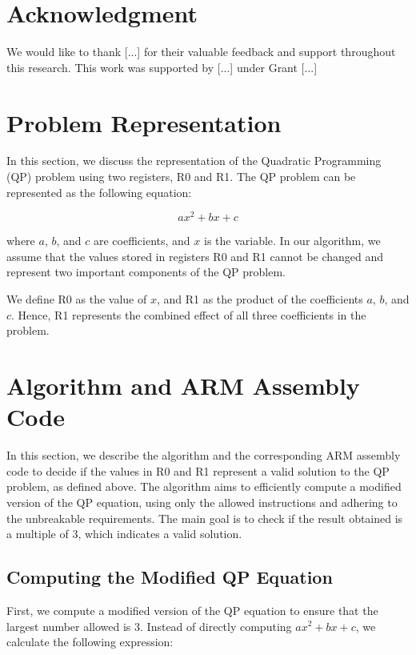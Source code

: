 \section*{Acknowledgment}

We would like to thank [...] for their valuable feedback and support throughout this research. This work was supported by [...] under Grant [...]

\section{Problem Representation}

In this section, we discuss the representation of the Quadratic Programming (QP) problem using two registers, R0 and R1. The QP problem can be represented as the following equation:

\begin{equation}
    ax^2 + bx + c
\end{equation}

where $a$, $b$, and $c$ are coefficients, and $x$ is the variable. In our algorithm, we assume that the values stored in registers R0 and R1 cannot be changed and represent two important components of the QP problem.

We define R0 as the value of $x$, and R1 as the product of the coefficients $a$, $b$, and $c$. Hence, R1 represents the combined effect of all three coefficients in the problem.

\section{Algorithm and ARM Assembly Code}

In this section, we describe the algorithm and the corresponding ARM assembly code to decide if the values in R0 and R1 represent a valid solution to the QP problem, as defined above. The algorithm aims to efficiently compute a modified version of the QP equation, using only the allowed instructions and adhering to the unbreakable requirements. The main goal is to check if the result obtained is a multiple of 3, which indicates a valid solution.

\subsection{Computing the Modified QP Equation}

First, we compute a modified version of the QP equation to ensure that the largest number allowed is 3. Instead of directly computing $ax^2 + bx + c$, we calculate the following expression:

